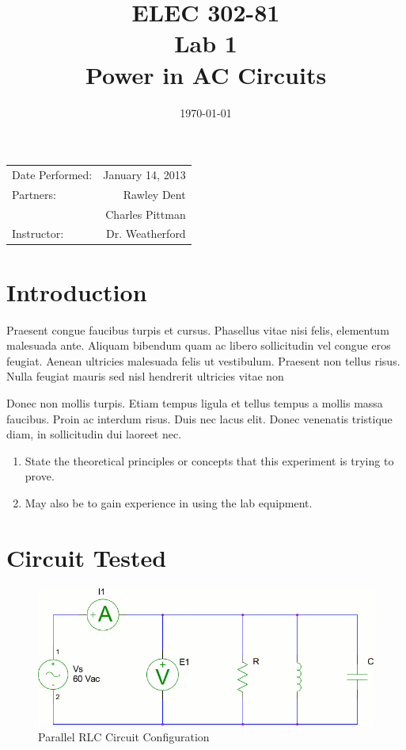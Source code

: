 \documentclass{article}
\title{ELEC 302-81\\ Lab 1\\ Power in AC Circuits} %
\date{\today} %
\begin{document}
\maketitle

\begin{center}
  \begin{tabular}{l r}
    Date Performed: & January 14, 2013 \\
    Partners: & Rawley Dent \\
    & Charles Pittman \\
    Instructor: & Dr. Weatherford
  \end{tabular}
\end{center}

\pagebreak

\setlength\parindent{0pt} %

\section{Introduction}
Praesent congue faucibus turpis et cursus. Phasellus vitae nisi felis,
elementum malesuada ante. Aliquam bibendum quam ac libero sollicitudin vel
congue eros feugiat. Aenean ultricies malesuada felis ut vestibulum. Praesent
non tellus risus. Nulla feugiat mauris sed nisl hendrerit ultricies vitae non

Donec non mollis turpis. Etiam tempus ligula et tellus tempus a mollis massa
faucibus. Proin ac interdum risus. Duis nec lacus elit. Donec venenatis
tristique diam, in sollicitudin dui laoreet nec.

\begin{enumerate}{}{}
  \item State the theoretical principles or concepts that this experiment is
    trying to prove.
  \item May also be to gain experience in using the lab equipment.
\end{enumerate}

\section{Circuit Tested}
\begin{figure}[h]
  \begin{center}
    \includegraphics[width=.8\textwidth]{test_circuit}
    \caption{Parallel RLC Circuit Configuration}
    \label{test_circuit}
  \end{center}
\end{figure}
\end{document}
